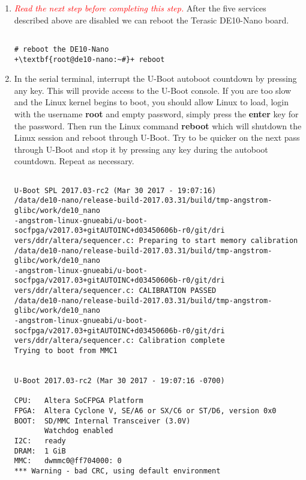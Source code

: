 \begin{flushleft}
\begin{enumerate}[
	label=\textbf{Step \arabic*.},
	leftmargin=*,
	widest={00},
	align=left]
\begin{verbatim}
\end{verbatim}

\item \textcolor{red}{\emph{Read the next step before completing this step.}} After the five services described above are disabled we can reboot the Terasic DE10-Nano board.

\begin{verbatim}

# reboot the DE10-Nano
+\textbf{root@de10-nano:~#}+ reboot

\end{verbatim}

\item In the serial terminal, interrupt the U-Boot autoboot countdown by pressing any key. This will provide access to the U-Boot console.  If you are too slow and the Linux kernel begins to boot, you should allow Linux to load, login with the username \textbf{root} and empty password, simply press the \textbf{enter} key for the password.  Then run the Linux command \textbf{reboot} which will shutdown the Linux session and reboot through U-Boot.  Try to be quicker on the next pass through U-Boot and stop it by pressing any key during the autoboot countdown.  Repeat as necessary.

\begin{verbatim}

U-Boot SPL 2017.03-rc2 (Mar 30 2017 - 19:07:16)
/data/de10-nano/release-build-2017.03.31/build/tmp-angstrom-glibc/work/de10_nano
-angstrom-linux-gnueabi/u-boot-socfpga/v2017.03+gitAUTOINC+d03450606b-r0/git/dri
vers/ddr/altera/sequencer.c: Preparing to start memory calibration
/data/de10-nano/release-build-2017.03.31/build/tmp-angstrom-glibc/work/de10_nano
-angstrom-linux-gnueabi/u-boot-socfpga/v2017.03+gitAUTOINC+d03450606b-r0/git/dri
vers/ddr/altera/sequencer.c: CALIBRATION PASSED
/data/de10-nano/release-build-2017.03.31/build/tmp-angstrom-glibc/work/de10_nano
-angstrom-linux-gnueabi/u-boot-socfpga/v2017.03+gitAUTOINC+d03450606b-r0/git/dri
vers/ddr/altera/sequencer.c: Calibration complete
Trying to boot from MMC1


U-Boot 2017.03-rc2 (Mar 30 2017 - 19:07:16 -0700)

CPU:   Altera SoCFPGA Platform
FPGA:  Altera Cyclone V, SE/A6 or SX/C6 or ST/D6, version 0x0
BOOT:  SD/MMC Internal Transceiver (3.0V)
       Watchdog enabled
I2C:   ready
DRAM:  1 GiB
MMC:   dwmmc0@ff704000: 0
*** Warning - bad CRC, using default environment


\end{verbatim}
\end{enumerate}
\end{flushleft}
